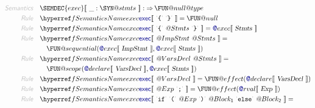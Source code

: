 \begin{align*}
  \KEY{Semantics} \quad
  & \SEMDEC{exec} \LEFTPHRASE \ \_ : \SYN@stmts \ \RIGHTPHRASE  
    :  \TO \FUN@null@type 
\\
  \KEY{Rule} \quad
    & \SEMREF{exec} \LEFTPHRASE \
                            \LEX{{\LEFTBRACE}} \ \LEX{{\RIGHTBRACE}} \
                          \RIGHTPHRASE  = 
      \FUN@null
\\
  \KEY{Rule} \quad
    & \SEMREF{exec} \LEFTPHRASE \
                            \LEX{{\LEFTBRACE}} \ \VAR@Stmts \ \LEX{{\RIGHTBRACE}} \
                          \RIGHTPHRASE  = 
      \SEM@exec \LEFTPHRASE \
                \VAR{Stmts} \
              \RIGHTPHRASE 
\\
  \KEY{Rule} \quad
    & \SEMREF{exec} \LEFTPHRASE \
                            \VAR@ImpStmt \ \VAR@Stmts \
                          \RIGHTPHRASE  = \\&\quad
      \FUN@sequential
        (  \SEM@exec \LEFTPHRASE \
                        \VAR{ImpStmt} \
                      \RIGHTPHRASE , 
               \SEM@exec \LEFTPHRASE \
                        \VAR{Stmts} \
                      \RIGHTPHRASE  )
\\
  \KEY{Rule} \quad
    & \SEMREF{exec} \LEFTPHRASE \
                            \VAR@VarsDecl \ \VAR@Stmts \
                          \RIGHTPHRASE  = \\&\quad
      \FUN@scope
        (  \SEM@declare \LEFTPHRASE \
                        \VAR{VarsDecl} \
                      \RIGHTPHRASE , 
               \SEM@exec \LEFTPHRASE \
                        \VAR{Stmts} \
                      \RIGHTPHRASE  )
\\
  \KEY{Rule} \quad
    & \SEMREF{exec} \LEFTPHRASE \
                            \VAR@VarsDecl \
                          \RIGHTPHRASE  = 
      \FUN@effect
        (  \SEM@declare \LEFTPHRASE \
                        \VAR{VarsDecl} \
                      \RIGHTPHRASE  )
\\
  \KEY{Rule} \quad
    & \SEMREF{exec} \LEFTPHRASE \
                            \VAR@Exp \ \LEX{{;}} \
                          \RIGHTPHRASE  = 
      \FUN@effect
        (  \SEM@rval \LEFTPHRASE \
                        \VAR{Exp} \
                      \RIGHTPHRASE  )
\\
  \KEY{Rule} \quad
    & \SEMREF{exec} \LEFTPHRASE \
                            \LEX{if} \ \LEX{{(}} \ \VAR@Exp \ \LEX{{)}} \ \VAR@Block\SUB{1} \ \LEX{else} \ \VAR@Block\SUB{2} \
                          \RIGHTPHRASE  = \\&\quad

\end{align*}
